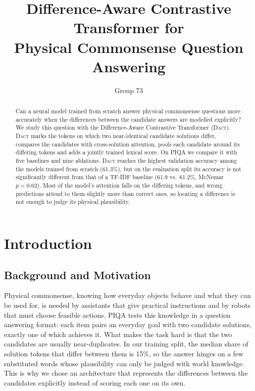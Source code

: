 \documentclass[11pt]{article}
\title{Difference-Aware Contrastive Transformer for\\Physical Commonsense Question Answering}
\author{Group 73}
\newcommand{\dact}{\textsc{Dact}}
\begin{document}
\maketitle

\begin{abstract}
Can a neural model trained from scratch answer physical commonsense questions more accurately when the differences between the candidate answers are modelled explicitly? We study this question with the Difference-Aware Contrastive Transformer (\dact{}). \dact{} marks the tokens on which two near-identical candidate solutions differ, compares the candidates with cross-solution attention, pools each candidate around its differing tokens and adds a jointly trained lexical score. On PIQA we compare it with five baselines and nine ablations. \dact{} reaches the highest validation accuracy among the models trained from scratch (61.3\%), but on the evaluation split its accuracy is not significantly different from that of a TF-IDF baseline (61.9 vs.\ 61.2\%, McNemar $p{=}0.62$). Most of the model's attention falls on the differing tokens, and wrong predictions attend to them slightly more than correct ones, so locating a difference is not enough to judge its physical plausibility.
\end{abstract}

\section{Introduction}

\subsection{Background and Motivation}
Physical commonsense, knowing how everyday objects behave and what they can be used for, is needed by assistants that give practical instructions and by robots that must choose feasible actions. PIQA \cite{bisk2020piqa} tests this knowledge in a question answering format: each item pairs an everyday goal with two candidate solutions, exactly one of which achieves it. What makes the task hard is that the two candidates are usually near-duplicates. In our training split, the median share of solution tokens that differ between them is 15\%, so the answer hinges on a few substituted words whose plausibility can only be judged with world knowledge. This is why we chose an architecture that represents the differences between the candidates explicitly instead of scoring each one on its own.
\end{document}
